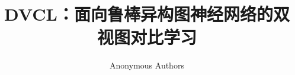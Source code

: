 \documentclass[10pt]{ctexart}
\title{DVCL：面向鲁棒异构图神经网络的双视图对比学习}
\author{Anonymous Authors}
\date{}
\begin{document}
\maketitle









\nocite{*}


\end{document}

